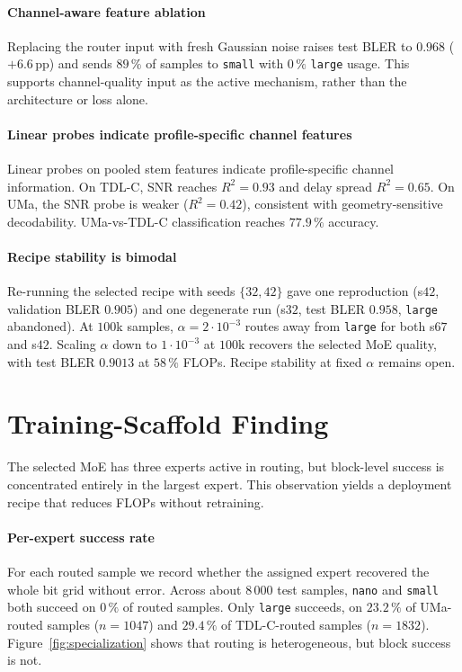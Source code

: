 \paragraph{Channel-aware feature ablation}
Replacing the router input with fresh Gaussian noise raises test BLER to $0.968$ ($+6.6$\,pp) and sends $89\,\%$ of samples to \texttt{small} with $0\,\%$ \texttt{large} usage. This supports channel-quality input as the active mechanism, rather than the architecture or loss alone.

\paragraph{Linear probes indicate profile-specific channel features}
Linear probes on pooled stem features indicate profile-specific channel information. On TDL-C, SNR reaches $R^2 = 0.93$ and delay spread $R^2 = 0.65$. On UMa, the SNR probe is weaker ($R^2 = 0.42$), consistent with geometry-sensitive decodability. UMa-vs-TDL-C classification reaches $77.9\,\%$ accuracy.


\paragraph{Recipe stability is bimodal}
Re-running the selected recipe with seeds $\{32, 42\}$ gave one reproduction (s$42$, validation BLER $0.905$) and one degenerate run (s$32$, test BLER $0.958$, \texttt{large} abandoned). At $100$k samples, $\alpha = 2 \cdot 10^{-3}$ routes away from \texttt{large} for both s$67$ and s$42$. Scaling $\alpha$ down to $1 \cdot 10^{-3}$ at $100$k recovers the selected MoE quality, with test BLER $0.9013$ at $58\,\%$ FLOPs. Recipe stability at fixed $\alpha$ remains open.

\section{Training-Scaffold Finding}
\label{sec:scaffold}

The selected MoE has three experts active in routing, but block-level success is concentrated entirely in the largest expert. This observation yields a deployment recipe that reduces FLOPs without retraining.

\paragraph{Per-expert success rate}
For each routed sample we record whether the assigned expert recovered the whole bit grid without error. Across about $8\,000$ test samples, \texttt{nano} and \texttt{small} both succeed on $0\,\%$ of routed samples. Only \texttt{large} succeeds, on $23.2\,\%$ of UMa-routed samples ($n{=}1047$) and $29.4\,\%$ of TDL-C-routed samples ($n{=}1832$). Figure~\ref{fig:specialization} shows that routing is heterogeneous, but block success is not.

